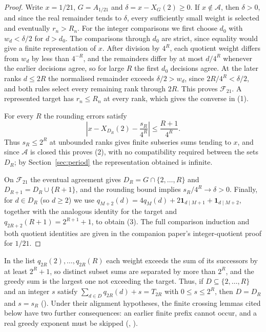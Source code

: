 \documentclass[11pt]{article}
\newcommand{\Ach}{\mathcal A}
\begin{document}
\begin{proof}
Write $x=1/21$, $G=A_{1/21}$ and $\delta=x-X_G(2)\ge0$. If
$x\notin\Ach$, then $\delta>0$, and since the real remainder tends to
$\delta$, every sufficiently small weight is selected and eventually
$r_n>R_n$. For the integer comparisons we first choose $d_0$ with
$w_d<\delta/2$ for $d>d_0$. The comparisons through $d_0$ are strict,
since equality would give a finite representation of $x$. After
division by $4^R$, each quotient weight differs from $w_d$ by less than
$4^{-R}$, and the remainders differ by at most $d/4^R$ whenever the
earlier decisions agree, so for large $R$ the first $d_0$ decisions
agree. At the later ranks $d\le2R$ the normalised remainder exceeds
$\delta/2>w_d$, since $2R/4^R<\delta/2$, and both rules select every
remaining rank through $2R$. This proves $\mathcal F_{21}$. A
represented target has $r_n\le R_n$ at every rank, which gives the
converse in (1).

For every $R$ the rounding errors satisfy
\begin{equation}
 \left|x-X_{D_R}(2)-\frac{s_R}{4^R}\right|
 \le\frac{R+1}{4^R}.
 \label{eq:twenty-one-rounding}
\end{equation}
Thus $s_R\le2^R$ at unbounded ranks gives finite subseries sums tending
to $x$, and since $\Ach$ is closed this proves (2), with no
compatibility required between the sets $D_R$; by
Section~\ref{sec:period} the representation obtained is infinite.

On $\mathcal F_{21}$ the eventual agreement gives
$D_R=G\cap\{2,\ldots,R\}$ and $D_{R+1}=D_R\cup\{R+1\}$, and the
rounding bound implies $s_R/4^R\to\delta>0$. Finally, for $d\in D_R$
(so $d\ge2$) we use
$q_{M+2}(d)=4q_M(d)+2\mathbf1_{d\mid M+1}+\mathbf1_{d\mid M+2}$,
together with the analogous identity for the target and
$q_{2R+2}(R+1)=2^{R+1}+1$, to obtain (3). The full comparison induction
and both quotient identities are given in
{the companion paper's integer-quotient proof for $1/21$}.
\end{proof}


\noindent In the list $q_{2R}(2),\ldots,q_{2R}(R)$ each weight exceeds
the sum of its successors by at least $2^R+1$, so distinct subset sums
are separated by more than $2^R$, and the greedy sum is the largest
one not exceeding the target. Thus, if
$D\subseteq\{2,\ldots,R\}$ and an integer $s$ satisfy
$\sum_{d\in D}q_{2R}(d)+s=T_{2R}$ with $0\le s\le2^R$, then
$D=D_R$ and $s=s_R$
().
Under their alignment hypotheses, the finite crossing lemmas cited
below have two further consequences: an earlier finite prefix cannot
occur, and a real greedy exponent must be skipped
(,
).
\end{document}
